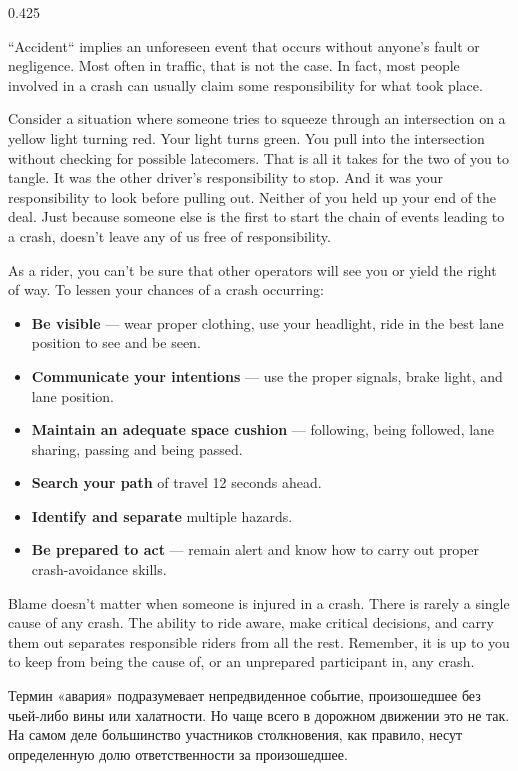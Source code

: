 
\begin{langblock}{0.425}
	\begin{eng}
	``Accident`` implies an unforeseen event that occurs without anyone's fault or negligence. Most often in traffic, that is not the case. In fact, most people involved in a crash can usually claim some responsibility for what took place.
	
	Consider a situation where someone tries to squeeze through an intersection on a yellow light turning red. Your light turns green. You pull into the intersection without checking for possible latecomers. That is all it takes for the two of you to tangle. It was the other driver's responsibility to stop. And it was your responsibility to look before pulling out. Neither of you held up your end of the deal. Just because someone else is the first to start the chain of events leading to a crash, doesn't leave any of us free of responsibility.
	
	As a rider, you can't be sure that other operators will see you or yield the right of way. To lessen your chances of a crash occurring:
	\begin{itemize}
		\item \textbf{Be visible} --- wear proper clothing, use your headlight, ride in the best lane position to see and be seen.
		\item \textbf{Communicate your intentions} --- use the proper signals, brake light, and lane position.
		\item \textbf{Maintain an adequate space cushion} --- following, being followed, lane sharing, passing and being passed.
		\item \textbf{Search your path} of travel 12 seconds ahead.
		\item \textbf{Identify and separate} multiple hazards.
		\item \textbf{Be prepared to act} --- remain alert and know how to carry out proper crash-avoidance skills.
	\end{itemize}
	Blame doesn't matter when someone is injured in a crash. There is rarely a single cause of any crash. The ability to ride aware, make critical decisions, and carry them out separates responsible riders from all the rest. Remember, it is up to you to keep from being the cause of, or an unprepared participant in, any crash.
	\end{eng}
	\begin{rus}
		Термин «авария» подразумевает непредвиденное событие, произошедшее без чьей-либо вины или халатности. Но чаще всего в дорожном движении это не так. На самом деле большинство участников столкновения, как правило, несут определенную долю ответственности за произошедшее. 
		

\end{rus}
\end{langblock}
